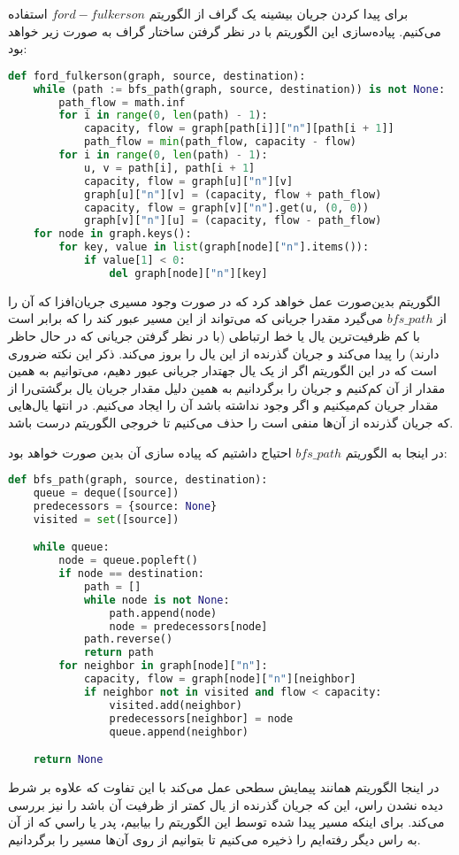 \documentclass[]{article}
\begin{document}
برای پیدا کردن جریان بیشینه یک گراف از الگوریتم $ford-fulkerson$ استفاده می‌کنیم.
پیاده‌سازی این الگوریتم با در نظر گرفتن ساختار گراف به صورت زیر خواهد بود:
\begin{latin}
\begin{lstlisting}[language=python]
def ford_fulkerson(graph, source, destination):
    while (path := bfs_path(graph, source, destination)) is not None:
        path_flow = math.inf
        for i in range(0, len(path) - 1):
            capacity, flow = graph[path[i]]["n"][path[i + 1]]
            path_flow = min(path_flow, capacity - flow)
        for i in range(0, len(path) - 1):
            u, v = path[i], path[i + 1]
            capacity, flow = graph[u]["n"][v]
            graph[u]["n"][v] = (capacity, flow + path_flow)
            capacity, flow = graph[v]["n"].get(u, (0, 0))
            graph[v]["n"][u] = (capacity, flow - path_flow)
    for node in graph.keys():
        for key, value in list(graph[node]["n"].items()):
            if value[1] < 0:
                del graph[node]["n"][key]
\end{lstlisting}
\end{latin}
الگوریتم بدین‌صورت عمل خواهد کرد که در صورت وجود مسیری جریان‌افزا که آن را از $bfs\_path$ می‌گیرد
مقدرا جریانی که می‌تواند از این مسیر عبور کند را که برابر است با کم ظرفیت‌ترین یال یا خط ارتباطی
(با در نظر گرفتن جریانی که در حال حاظر دارند) را پیدا می‌کند
و جریان گذرنده از این یال را بروز می‌کند. ذکر این نکته ضروری است که در این الگوریتم
اگر از یک یال جهتدار جریانی عبور دهیم، می‌توانیم به همین مقدار از آن کم‌کنیم و جریان‌ را برگردانیم
به همین دلیل مقدار جریان یال برگشتی‌را از مقدار جریان کم‌میکنیم و اگر وجود نداشته باشد آن را ایجاد می‌کنیم.
در انتها یال‌هایی که جریان گذرنده از آن‌ها منفی است را حذف می‌کنیم تا خروجی الگوریتم درست باشد.

در اینجا به الگوریتم $bfs\_path$ احتیاج داشتیم که پیاده سازی آن بدین صورت خواهد بود:
\begin{latin}
\begin{lstlisting}[language=python]
def bfs_path(graph, source, destination):
    queue = deque([source])
    predecessors = {source: None}
    visited = set([source])

    while queue:
        node = queue.popleft()
        if node == destination:
            path = []
            while node is not None:
                path.append(node)
                node = predecessors[node]
            path.reverse()
            return path
        for neighbor in graph[node]["n"]:
            capacity, flow = graph[node]["n"][neighbor]
            if neighbor not in visited and flow < capacity:
                visited.add(neighbor)
                predecessors[neighbor] = node
                queue.append(neighbor)

    return None
\end{lstlisting}
\end{latin}
در اینجا الگوریتم همانند پیمایش سطحی عمل می‌کند با این تفاوت که علاوه بر شرط دیده نشدن راس،
این که جریان گذرنده از یال کمتر از ظرفیت آن باشد را نیز بررسی می‌کند.
برای اینکه مسیر پیدا شده توسط این الگوریتم را بیابیم، پدر یا راسي که از آن به راس دیگر رفته‌ایم
را ذخیره می‌کنیم تا بتوانیم از روی‌ آن‌ها مسیر را بر‌گردانیم.
\end{document}
